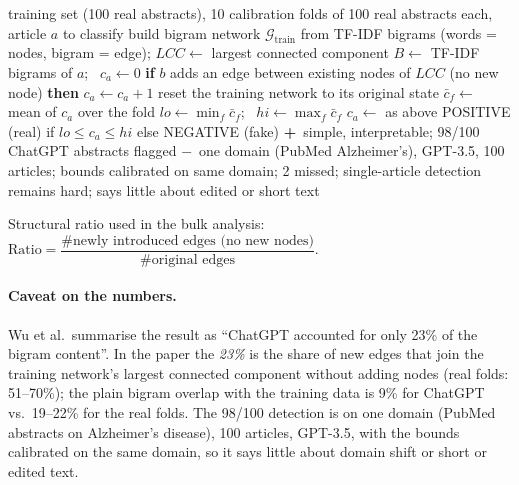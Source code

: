 \documentclass[10pt,a4paper,twocolumn]{article}
\newcommand{\pro}[1]{\Statex\textcolor{proc}{\textbf{+}\ #1}}
\newcommand{\con}[1]{\Statex\textcolor{conc}{\textbf{$-$}\ #1}}
\begin{document}
\begin{algorithm}[H]\small
\caption{xFakeBibs bigram-network detector (Hamed \& Wu 2023)}
\begin{algorithmic}[1]
\Require training set (100 real abstracts), 10 calibration folds of 100 real abstracts each, article $a$ to classify
 \State build bigram network $\mathcal G_{\mathrm{train}}$ from TF-IDF bigrams (words = nodes, bigram = edge); $\mathit{LCC}\gets$ largest connected component
\EndProcedure
{}
   \State $B\gets$ TF-IDF bigrams of $a$; \ $c_a\gets0$
    \State \textbf{if} $b$ adds an edge between existing nodes of $\mathit{LCC}$ (no new node) \textbf{then} $c_a\gets c_a+1$
   \EndFor
   \State reset the training network to its original state
  \EndFor
  \State $\bar c_f\gets$ mean of $c_a$ over the fold
 \EndFor
 \State $\mathit{lo}\gets\min_f\bar c_f$; \ $\mathit{hi}\gets\max_f\bar c_f$ 
\EndProcedure
{}
 \State $c_a\gets$ as above \Return POSITIVE (real) if $\mathit{lo}\le c_a\le\mathit{hi}$ else NEGATIVE (fake)
\EndFunction
\pro{simple, interpretable; 98/100 ChatGPT abstracts flagged}
\con{one domain (PubMed Alzheimer's), GPT-3.5, 100 articles; bounds calibrated on same domain; 2 missed; single-article detection remains hard; says little about edited or short text}
\end{algorithmic}
\end{algorithm}
Structural ratio used in the bulk analysis: $\mathrm{Ratio}=\dfrac{\#\text{newly introduced edges (no new nodes)}}{\#\text{original edges}}$.

\paragraph{Caveat on the numbers.} Wu et al.\ summarise the result as ``ChatGPT accounted for only 23\% of the bigram content''. In the paper the \emph{23\%} is the share of new edges that join the training network's largest connected component without adding nodes (real folds: 51--70\%); the plain bigram overlap with the training data is 9\% for ChatGPT vs.\ 19--22\% for the real folds. The 98/100 detection is on one domain (PubMed abstracts on Alzheimer's disease), 100 articles, GPT-3.5, with the bounds calibrated on the same domain, so it says little about domain shift or short or edited text.
\end{document}

